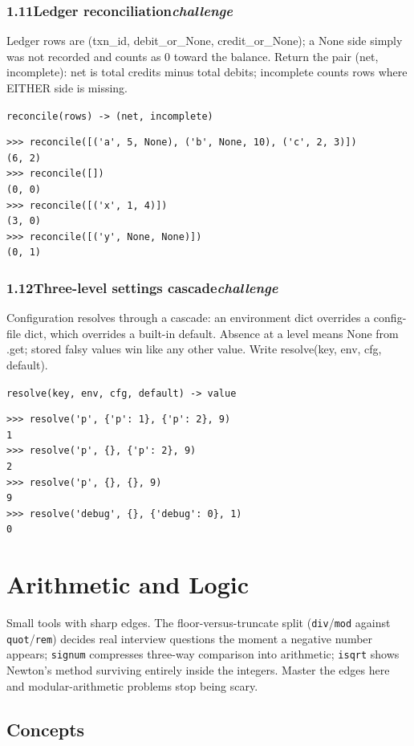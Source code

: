 \documentclass[10pt,letterpaper]{book}
\begin{document}
\subsection*{1.11\quad Ledger reconciliation\hfill\textnormal{\textit{challenge}}}
Ledger rows are (txn\_id, debit\_or\_None, credit\_or\_None); a None side simply was not recorded and counts as 0 toward the balance. Return the pair (net, incomplete): net is total credits minus total debits; incomplete counts rows where EITHER side is missing.

\noindent\texttt{reconcile(rows) -> (net, incomplete)}
\begin{lstlisting}[style=ex]
>>> reconcile([('a', 5, None), ('b', None, 10), ('c', 2, 3)])
(6, 2)
>>> reconcile([])
(0, 0)
>>> reconcile([('x', 1, 4)])
(3, 0)
>>> reconcile([('y', None, None)])
(0, 1)
\end{lstlisting}
\subsection*{1.12\quad Three-level settings cascade\hfill\textnormal{\textit{challenge}}}
Configuration resolves through a cascade: an environment dict overrides a config-file dict, which overrides a built-in default. Absence at a level means None from .get; stored falsy values win like any other value. Write resolve(key, env, cfg, default).

\noindent\texttt{resolve(key, env, cfg, default) -> value}
\begin{lstlisting}[style=ex]
>>> resolve('p', {'p': 1}, {'p': 2}, 9)
1
>>> resolve('p', {}, {'p': 2}, 9)
2
>>> resolve('p', {}, {}, 9)
9
>>> resolve('debug', {}, {'debug': 0}, 1)
0
\end{lstlisting}
\clearpage
\chapter{Arithmetic and Logic}

Small tools with sharp edges. The floor-versus-truncate split
(\texttt{div}/\texttt{mod} against \texttt{quot}/\texttt{rem}) decides real
interview questions the moment a negative number appears; \texttt{signum}
compresses three-way comparison into arithmetic; \texttt{isqrt} shows Newton's
method surviving entirely inside the integers. Master the edges here and
modular-arithmetic problems stop being scary.
\section{Concepts}
\end{document}
